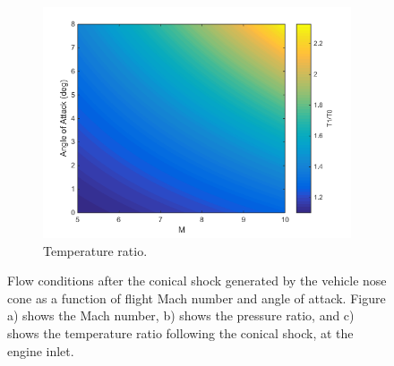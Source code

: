 \begin{figure}[ht]
\begin{subfigure}{.5\textwidth}
		\includegraphics[width=0.99\linewidth]{figures/3_vehicle_design/ConicalT}
		\caption{Temperature ratio.}
		\label{fig:ConicalT}
	\end{subfigure}
	\caption{Flow conditions after the conical shock generated by the vehicle nose cone as a function of flight Mach number and angle of attack. Figure a) shows the Mach number, b) shows the pressure ratio, and c) shows the temperature ratio following the conical shock, at the engine inlet.}
	\label{fig:ConicalShock}
\end{figure}


